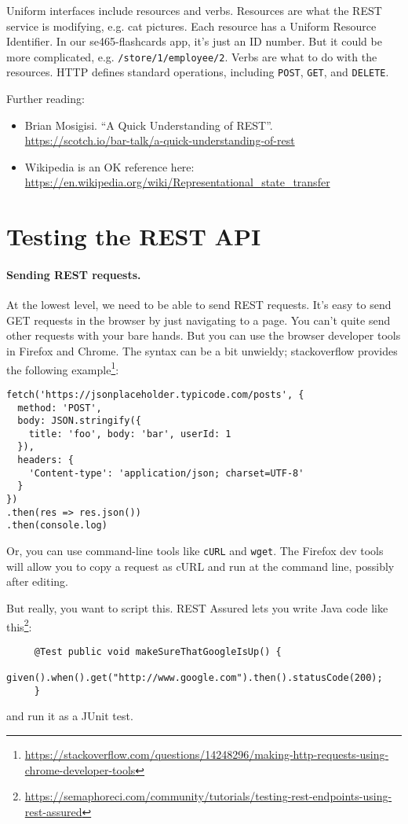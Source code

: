 \documentclass[11pt]{article}
\begin{document}
Uniform interfaces include resources and verbs. Resources are what the
REST service is modifying, e.g. cat pictures. Each resource has a
Uniform Resource Identifier. In our se465-flashcards app, it's just an
ID number. But it could be more complicated, e.g. {\tt /store/1/employee/2}.
Verbs are what to do with the resources. HTTP defines standard
operations, including {\tt POST}, {\tt GET}, and {\tt DELETE}.


Further reading:
\begin{itemize}[noitemsep]
\item Brian Mosigisi. ``A Quick Understanding of REST''. \\
  \url{https://scotch.io/bar-talk/a-quick-understanding-of-rest}
\item Wikipedia is an OK reference here: \url{https://en.wikipedia.org/wiki/Representational_state_transfer}
\end{itemize}

\section*{Testing the REST API}
\paragraph{Sending REST requests.} At the lowest level, we need to be able to send REST requests.
It's easy to send GET requests in the browser by just navigating to a page. You can't quite send other
requests with your bare hands. But you can use the browser developer tools in Firefox and Chrome.
The syntax can be a bit unwieldy; stackoverflow provides the following example\footnote{\url{https://stackoverflow.com/questions/14248296/making-http-requests-using-chrome-developer-tools}}:

{\scriptsize
\begin{lstlisting}
fetch('https://jsonplaceholder.typicode.com/posts', {
  method: 'POST',
  body: JSON.stringify({
    title: 'foo', body: 'bar', userId: 1
  }),
  headers: {
    'Content-type': 'application/json; charset=UTF-8'
  }
})
.then(res => res.json())
.then(console.log)
\end{lstlisting}
}

Or, you can use command-line tools like {\tt cURL} and {\tt wget}. The Firefox dev tools will allow you to
copy a request as cURL and run at the command line, possibly after editing.

But really, you want to script this. REST Assured lets you write Java code like this\footnote{\url{https://semaphoreci.com/community/tutorials/testing-rest-endpoints-using-rest-assured}}:
{\small
  \begin{lstlisting}
     @Test public void makeSureThatGoogleIsUp() {
         given().when().get("http://www.google.com").then().statusCode(200);
     }
  \end{lstlisting}
  }
and run it as a JUnit test.
\end{document}

